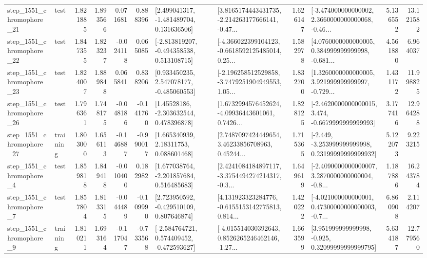 \begin{tabular}{llrrrrllrlrr}
 step\_1551\_chromophore\_21 &      test &      1.821885 &    1.893566 &      0.071681 &  0.888396 &    [2.499041317, -1.481489704, 0.131636506] &  [3.8165174443431735, -2.214263177666141, -0.47... &       1.626147 &  [-3.474000000000002, 2.3660000000000068, -0.46... &            5.136552 &         13.121582 \\
 step\_1551\_chromophore\_22 &      test &      1.847355 &    1.823237 &     -0.024118 &  0.065085 &   [-2.813819207, -0.494358538, 0.513108715] &  [-4.366022399104123, -0.6618592125485014, 0.25... &       1.582978 &  [4.0760000000000005, 0.384999999999998, -0.681... &            4.561880 &          6.964037 \\
 step\_1551\_chromophore\_23 &      test &      1.824007 &    1.889848 &      0.065841 &  0.838206 &    [0.933450235, 2.547078177, -0.485060553] &  [-2.196258512529858, -3.7479251904949553, 1.05... &       1.832700 &  [1.3260000000000005, 3.921999999999997, -0.729... &            1.431172 &         11.998825 \\
 step\_1551\_chromophore\_26 &      test &      1.796361 &    1.748175 &     -0.048186 & -0.141760 &     [1.45528186, -2.303632544, 0.478396878] &  [1.6732994576452624, -4.09936443601061, 0.7426... &       1.828125 &  [-2.4620000000000015, 3.474, -0.6679999999999993] &            3.177416 &         12.964288 \\
 step\_1551\_chromophore\_27 &  training &      1.803000 &    1.656113 &     -0.146887 & -0.990017 &      [1.665340939, 2.18311753, 0.088601468] &  [2.7487097424449654, 3.46233856708963, 0.45244... &       1.715365 &  [-2.449, -3.253999999999998, 0.23199999999999932] &            5.122073 &          9.223215 \\
  step\_1551\_chromophore\_4 &      test &      1.859818 &    1.849418 &     -0.010400 &  0.182982 &    [1.677038764, -2.201857684, 0.516485683] &  [2.4241084184897117, -3.3754494274214317, -0.3... &       1.649619 &  [-2.4090000000000007, 3.2870000000000004, -0.8... &            1.187886 &         16.243784 \\
  step\_1551\_chromophore\_7 &      test &      1.857804 &    1.813315 &     -0.044489 & -0.109990 &    [2.723950592, -0.429510109, 0.807646874] &  [4.131923323284776, -0.6155153142775813, 0.814... &       1.420222 &  [-4.021000000000001, 0.47300000000000003, -0.7... &            6.860908 &          2.114207 \\
  step\_1551\_chromophore\_9 &  training &      1.810211 &    1.693164 &     -0.117047 & -0.733568 &   [-2.584764721, 0.574409452, -0.472593627] &  [-4.015514030392643, 0.8526265246462146, -1.27... &       1.663599 &   [3.951999999999998, -0.925, 0.32099999999999795] &            5.634187 &         12.779560 \\

\end{tabular}
